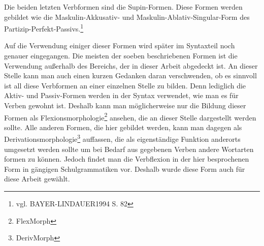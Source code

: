 \documentclass[12pt,abstract=on]{scrreprt}
\begin{document}
Die beiden letzten Verbformen sind die Supin-Formen. Diese Formen werden gebildet wie die Maskulin-Akkusativ- und Maskulin-Ablativ-Singular-Form des Partizip-Perfekt-Passivs.\footnote{vgl. BAYER-LINDAUER1994 S. 82} \par
Auf die Verwendung einiger dieser Formen wird später im Syntaxteil noch genauer eingegangen. Die meisten der soeben beschriebenen Formen ist die Verwendung außerhalb des Bereichs, der in dieser Arbeit abgedeckt ist. An dieser Stelle kann man auch einen kurzen Gedanken daran verschwenden, ob es sinnvoll ist all diese Verbformen an einer einzelnen Stelle zu bilden. Denn lediglich die Aktiv- und Passiv-Formen werden in der Syntax verwendet, wie man es für Verben gewohnt ist. Deshalb kann man möglicherweise nur die Bildung dieser Formen als Flexionsmorphologie\footnote{FlexMorph} ansehen, die an dieser Stelle dargestellt werden sollte. Alle anderen Formen, die hier gebildet werden, kann man dagegen als Derivationsmorphologie\footnote{DerivMorph} auffassen, die als eigenständige Funktion anderorts umgesetzt werden sollte um bei Bedarf aus gegebenen Verben andere Wortarten formen zu können. Jedoch findet man die Verbflexion in der hier besprochenen Form in gängigen Schulgrammatiken vor. Deshalb wurde diese Form auch für diese Arbeit gewählt. %
\end{document}
